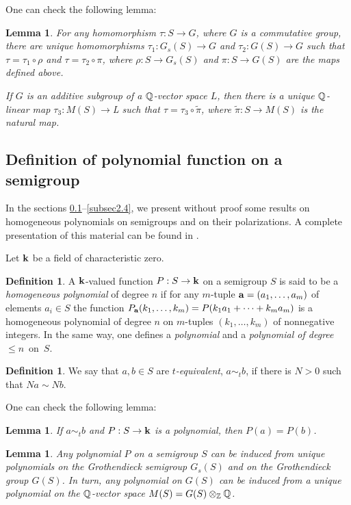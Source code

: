 \documentclass[11pt]{article}
\theoremstyle{plain}
\newtheorem{lemma}[theorem]{Lemma}
\theoremstyle{definition}
\newtheorem{definition}[theorem]{Definition}
\begin{document}
One can  check the following lemma:

\begin{lemma} For any homomorphism $\tau:S\to G$, where $G$ is a
commutative group, there are unique homomorphisms $\tau_1:G_s(S)\to G$
and $\tau_2:G(S)\to G$ such that $\tau =\tau_1\circ \rho$ and
$\tau=\tau_2\circ\pi$, where $\rho:S\to G_s(S)$ and $\pi: S\to G(S)$ are
the maps defined above.

If $G$ is an additive subgroup of a $\Bbb Q$-vector space $L$, then there is a unique $\Bbb Q$-linear map $\tau_3:M(S)\to $L$  $ such that $\tau
=\tau_3\circ \tilde \pi$, where $\tilde \pi:S\to M(S)$ is the natural
map.
  \end{lemma}

\subsection{Definition of polynomial function on a semigroup}\label{subsec2.2}
In the sections \ref{subsec2.2}--\ref{subsec2.4}, we present without
proof some results on homogeneous polynomials on semigroups and on their
polarizations. A complete presentation of this material can be found in
\cite{Kh25}.

Let $\bold k$ be a field of characteristic zero.

\begin{definition} A $\bold k$-valued function  $P:S\to \bold k$  on a
semigroup $S$ is said to be a  {\it homogeneous polynomial} of degree $n$
if for any $m$-tuple $\bold a=(a_1,\dots, a_m)$  of elements  $a_i\in S$
   the function $P_{\bold a}(k_1,\dots, k_m)= P(k_1a_1+\dots+k_ma_m)$ is
a  homogeneous polynomial of degree $n$ on $m$-tuples $(k_1,\dots, k_m)$
of nonnegative integers. In the same way, one defines  a {\it
polynomial}  and   a {\it polynomial of degree $\leq n$}~on~$S$.
\end{definition}

\begin{definition} We say that $a,b\in S$ are {\it $t$-equivalent},
$a\sim_t b$, if there is  $N>0 $ such that $Na\sim Nb$.
\end{definition}

One can check the following lemma:

\begin{lemma}\label{polynomial} If $a\sim_t b$  and $P:S\to \bold k$ is
a polynomial, then $P(a)=P(b)$.
  \end{lemma}

\begin{lemma}\label{red} Any polynomial $P$ on a semigroup $S$  can be
induced  from  unique polynomials  on the Grothendieck semigroup
$G_s(S)$ and on the   Grothendieck group $G(S)$. In turn, any
polynomial on  $G(S)$ can be induced from a unique polynomial on the $\Bbb Q$-vector space  $M(S)=G(S)\otimes_\Bbb Z \Bbb Q$.
\end{lemma}
\end{document}
